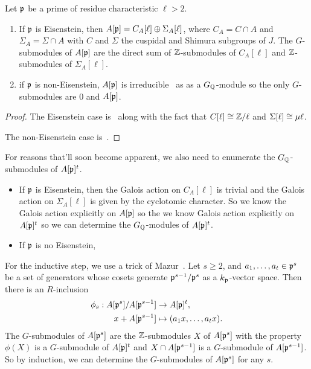 \documentclass{article}
\begin{document}
\begin{proposition}[Mazur]\label{prop:all_G_subs}
    Let $\mathfrak{p}$ be a prime of residue characteristic $\ell>2$.
    \begin{enumerate}
        \item 
            If $\mathfrak{p}$ is Eisenstein, then $A[\mathfrak{p}]=C_A[\ell]\oplus \Sigma_A[\ell]$,
            where $C_A=C\cap A$ and $\Sigma_A=\Sigma \cap A$ with $C$ and
            $\Sigma$ the cuspidal and Shimura subgroups of $J$. The
            $G$-submodules of $A[\mathfrak{p}]$ are the direct sum of $\mathbb{Z}$-submodules of
            $C_A[\ell]$ and $\mathbb{Z}$-submodules of $\Sigma_A[\ell]$.
        \item
            if $\mathfrak{p}$ is non-Eisenstein, $A[\mathfrak{p}]$ is irreducible~\cite[Prop
            14.2]{mazur:eisenstein} as as a $G_{\mathbb{Q}}$-module so the only
            $G$-submodules are $0$ and $A[\mathfrak{p}]$.
    \end{enumerate}
\end{proposition}
\begin{proof}
    The Eisenstein case is~\cite[Corollary 16.3]{mazur:eisenstein} along with
    the fact that $C[\ell]\cong \mathbb{Z}/\ell$ and $\Sigma[\ell]\cong \mu\ell$.

    The non-Eisenstein case is~\cite[Propositon 14.2]{mazur:eisenstein}.
\end{proof}

For reasons that'll soon become apparent, we also need to enumerate the
$G_{\mathbb{Q}}$-submodules of $A[\mathfrak{p}]^t$.
\begin{itemize}
    \item 
        If $\mathfrak{p}$ is Eisenstein, then the Galois action on $C_A[\ell]$ is trivial
        and the Galois action on $\Sigma_A[\ell]$ is given by the cyclotomic
        character. So we know the Galois action explicitly on $A[\mathfrak{p}]$ so the we
        know Galois action explicitly on $A[\mathfrak{p}]^t$ so we can determine the
        $G_{\mathbb{Q}}$-modules of $A[\mathfrak{p}]^t$.
    \item
        If $\mathfrak{p}$ is no Eisenstein, 
\end{itemize}


For the inductive step, we use a trick of Mazur~\cite[pg.
112]{mazur:eisenstein}. Let $s\geq 2$, and
$a_1,\ldots,a_t\in \mathfrak{p}^s$ be a set of generators whose cosets generate
$\mathfrak{p}^{s-1}/\mathfrak{p}^s$ as a $k_{\mathfrak{p}}$-vector space. Then there is an $R$-inclusion
\begin{align*}
    \phi_s: A[\mathfrak{p}^s]/A[\mathfrak{p}^{s-1}] & \to A[\mathfrak{p}]^t, \\
    x+A[\mathfrak{p}^{s-1}] & \mapsto (a_1x,\ldots,a_tx).
\end{align*}
The $G$-submodules of $A[\mathfrak{p}^s]$ are the $\mathbb{Z}$-submodules $X$ of $A[\mathfrak{p}^s]$ with
the property $\phi(X)$ is a $G$-submodule of $A[\mathfrak{p}]^t$ and $X\cap A[\mathfrak{p}^{s-1}]$
is a $G$-submodule of $A[\mathfrak{p}^{s-1}]$. So by induction, we can determine the
$G$-submodules of $A[\mathfrak{p}^s]$ for any $s$. 


\end{document}
